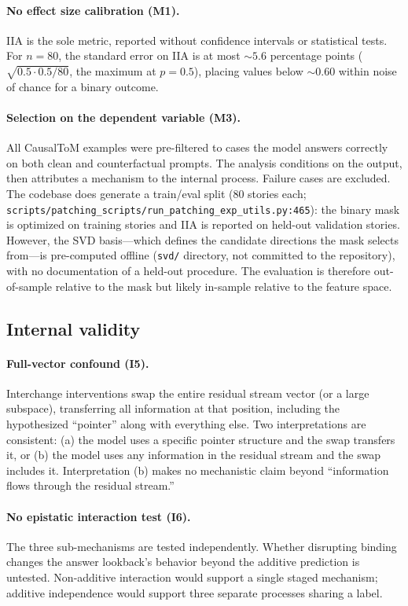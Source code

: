 \documentclass[11pt]{article}
\begin{document}
\paragraph{No effect size calibration (M1).}
IIA is the sole metric, reported without confidence intervals or statistical tests. For $n = 80$, the standard error on IIA is at most ${\sim}5.6$ percentage points ($\sqrt{0.5 \cdot 0.5 / 80}$, the maximum at $p = 0.5$), placing values below ${\sim}0.60$ within noise of chance for a binary outcome.

\paragraph{Selection on the dependent variable (M3).}
All CausalToM examples were pre-filtered to cases the model answers correctly on both clean and counterfactual prompts. The analysis conditions on the output, then attributes a mechanism to the internal process. Failure cases are excluded. The codebase does generate a train/eval split (80 stories each; \texttt{scripts/patching\_scripts/run\_patching\_exp\_utils.py:465}): the binary mask is optimized on training stories and IIA is reported on held-out validation stories. However, the SVD basis---which defines the candidate directions the mask selects from---is pre-computed offline (\texttt{svd/} directory, not committed to the repository), with no documentation of a held-out procedure. The evaluation is therefore out-of-sample relative to the mask but likely in-sample relative to the feature space.

\subsection{Internal validity}

\paragraph{Full-vector confound (I5).}
Interchange interventions swap the entire residual stream vector (or a large subspace), transferring all information at that position, including the hypothesized ``pointer'' along with everything else. Two interpretations are consistent: (a) the model uses a specific pointer structure and the swap transfers it, or (b) the model uses any information in the residual stream and the swap includes it. Interpretation (b) makes no mechanistic claim beyond ``information flows through the residual stream.''

\paragraph{No epistatic interaction test (I6).}
The three sub-mechanisms are tested independently. Whether disrupting binding changes the answer lookback's behavior beyond the additive prediction is untested. Non-additive interaction would support a single staged mechanism; additive independence would support three separate processes sharing a label.
\end{document}
